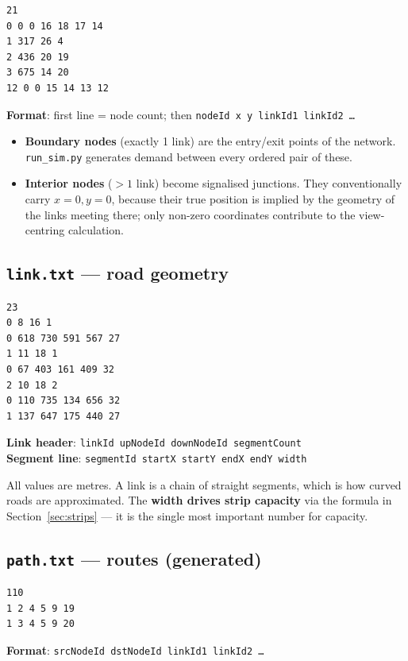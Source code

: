 \documentclass[11pt, a4paper]{article}
\newcommand{\code}[1]{\texttt{#1}}
\begin{document}
\begin{lstlisting}[caption=Sample node.txt]
21
0 0 0 16 18 17 14
1 317 26 4
2 436 20 19
3 675 14 20
12 0 0 15 14 13 12
\end{lstlisting}

\textbf{Format}: first line = node count; then
\code{nodeId  x  y  linkId1  linkId2  \dots}
\begin{itemize}
    \item \textbf{Boundary nodes} (exactly 1 link) are the entry/exit points of
          the network. \code{run\_sim.py} generates demand between every ordered
          pair of these.
    \item \textbf{Interior nodes} ($>1$ link) become signalised junctions. They
          conventionally carry $x=0, y=0$, because their true position is implied
          by the geometry of the links meeting there; only non-zero coordinates
          contribute to the view-centring calculation.
\end{itemize}

\subsection{\code{link.txt} --- road geometry}

\begin{lstlisting}[caption=Sample link.txt]
23
0 8 16 1
0 618 730 591 567 27
1 11 18 1
0 67 403 161 409 32
2 10 18 2
0 110 735 134 656 32
1 137 647 175 440 27
\end{lstlisting}

\textbf{Link header}: \code{linkId  upNodeId  downNodeId  segmentCount} \\
\textbf{Segment line}: \code{segmentId  startX  startY  endX  endY  width}

All values are metres. A link is a chain of straight segments, which is how
curved roads are approximated. The \textbf{width drives strip capacity} via the
formula in Section~\ref{sec:strips} --- it is the single most important number
for capacity.

\subsection{\code{path.txt} --- routes (generated)}

\begin{lstlisting}[caption=Sample path.txt]
110
1 2 4 5 9 19
1 3 4 5 9 20
\end{lstlisting}

\textbf{Format}: \code{srcNodeId  dstNodeId  linkId1  linkId2  \dots}
\end{document}
